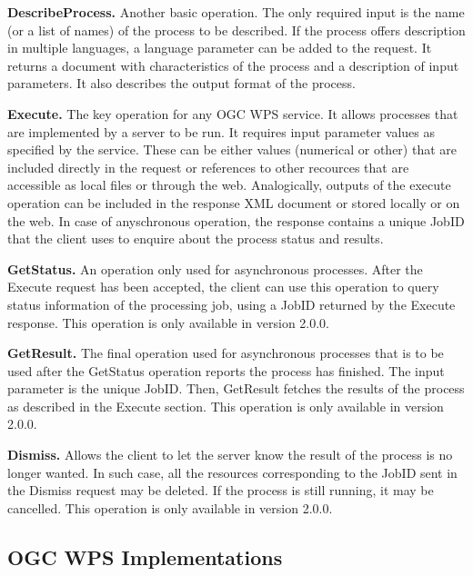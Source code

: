 \noindent \textbf{DescribeProcess.} Another basic operation. The only required input is the name (or a list of names) of the process to be described. If the process offers description in multiple languages, a language parameter can be added to the request. It returns a document with characteristics of the process and a description of input parameters. It also describes the output format of the process.

\noindent \textbf{Execute.} The key operation for any OGC WPS service. It allows processes that are implemented by a server to be run. It requires input parameter values as specified by the service. These can be either values (numerical or other) that are included directly in the request or references to other recources that are accessible as local files or through the web. Analogically, outputs of the execute operation can be included in the response XML document or stored locally or on the web. In case of anyschronous operation, the response contains a unique JobID that the client uses to enquire about the process status and results.

\noindent \textbf{GetStatus.} An operation only used for asynchronous processes. After the Execute request has been accepted, the client can use this operation to query status information of the processing job, using a JobID returned by the Execute response. This operation is only available in version 2.0.0.

\noindent \textbf{GetResult.} The final operation used for asynchronous processes that is to be used after the GetStatus operation reports the process has finished. The input parameter is the unique JobID. Then, GetResult fetches the results of the process as described in the Execute section. This operation is only available in version 2.0.0.

\noindent \textbf{Dismiss.} Allows the client to let the server know the result of the process is no longer wanted. In such case, all the resources corresponding to the JobID sent in the Dismiss request may be deleted. If the process is still running, it may be cancelled. This operation is only available in version 2.0.0.

\subsection{OGC WPS Implementations}


